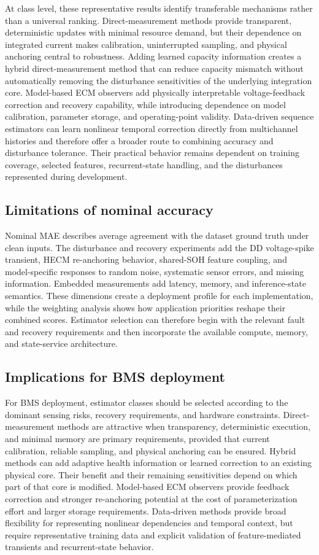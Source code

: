 \documentclass[review,nopreprintline]{elsarticle}
\begin{document}
At class level, these representative results identify transferable mechanisms rather than a universal ranking. Direct-measurement methods provide transparent, deterministic updates with minimal resource demand, but their dependence on integrated current makes calibration, uninterrupted sampling, and physical anchoring central to robustness. Adding learned capacity information creates a hybrid direct-measurement method that can reduce capacity mismatch without automatically removing the disturbance sensitivities of the underlying integration core. Model-based ECM observers add physically interpretable voltage-feedback correction and recovery capability, while introducing dependence on model calibration, parameter storage, and operating-point validity. Data-driven sequence estimators can learn nonlinear temporal correction directly from multichannel histories and therefore offer a broader route to combining accuracy and disturbance tolerance. Their practical behavior remains dependent on training coverage, selected features, recurrent-state handling, and the disturbances represented during development.

\subsection{Limitations of nominal accuracy}
Nominal MAE describes average agreement with the dataset ground truth under clean inputs. The disturbance and recovery experiments add the DD voltage-spike transient, HECM re-anchoring behavior, shared-SOH feature coupling, and model-specific responses to random noise, systematic sensor errors, and missing information. Embedded measurements add latency, memory, and inference-state semantics. These dimensions create a deployment profile for each implementation, while the weighting analysis shows how application priorities reshape their combined scores. Estimator selection can therefore begin with the relevant fault and recovery requirements and then incorporate the available compute, memory, and state-service architecture.

\subsection{Implications for BMS deployment}
For BMS deployment, estimator classes should be selected according to the dominant sensing risks, recovery requirements, and hardware constraints. Direct-measurement methods are attractive when transparency, deterministic execution, and minimal memory are primary requirements, provided that current calibration, reliable sampling, and physical anchoring can be ensured. Hybrid methods can add adaptive health information or learned correction to an existing physical core. Their benefit and their remaining sensitivities depend on which part of that core is modified. Model-based ECM observers provide feedback correction and stronger re-anchoring potential at the cost of parameterization effort and larger storage requirements. Data-driven methods provide broad flexibility for representing nonlinear dependencies and temporal context, but require representative training data and explicit validation of feature-mediated transients and recurrent-state behavior.
\end{document}
